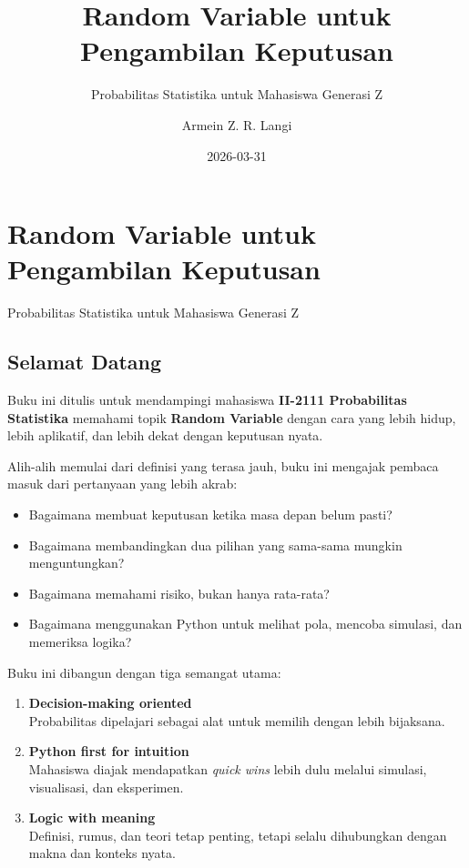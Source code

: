 \documentclass[
  letterpaper,
  DIV=11,
  numbers=noendperiod]{scrreprt}
\title{Random Variable untuk Pengambilan Keputusan}
\subtitle{Probabilitas Statistika untuk Mahasiswa Generasi Z}
\author{Armein Z. R. Langi}
\date{2026-03-31}
\providecommand{\tightlist}{%
  \setlength{\itemsep}{0pt}\setlength{\parskip}{0pt}}
\renewcommand*\contentsname{Table of contents}
\newcommand\contentsname{Table of contents}
\begin{document}
\maketitle

\renewcommand*\contentsname{Table of contents}
{
\setcounter{tocdepth}{2}
\tableofcontents
}


\chapter{Random Variable untuk Pengambilan
Keputusan}\label{random-variable-untuk-pengambilan-keputusan}

Probabilitas Statistika untuk Mahasiswa Generasi Z

\hfill\break

\section{Selamat Datang}\label{selamat-datang}

Buku ini ditulis untuk mendampingi mahasiswa \textbf{II-2111
Probabilitas Statistika} memahami topik \textbf{Random Variable} dengan
cara yang lebih hidup, lebih aplikatif, dan lebih dekat dengan keputusan
nyata.

Alih-alih memulai dari definisi yang terasa jauh, buku ini mengajak
pembaca masuk dari pertanyaan yang lebih akrab:

\begin{itemize}
\tightlist
\item
  Bagaimana membuat keputusan ketika masa depan belum pasti?
\item
  Bagaimana membandingkan dua pilihan yang sama-sama mungkin
  menguntungkan?
\item
  Bagaimana memahami risiko, bukan hanya rata-rata?
\item
  Bagaimana menggunakan Python untuk melihat pola, mencoba simulasi, dan
  memeriksa logika?
\end{itemize}

Buku ini dibangun dengan tiga semangat utama:

\begin{enumerate}
\def\labelenumi{\arabic{enumi}.}
\item
  \textbf{Decision-making oriented}\\
  Probabilitas dipelajari sebagai alat untuk memilih dengan lebih
  bijaksana.
\item
  \textbf{Python first for intuition}\\
  Mahasiswa diajak mendapatkan \emph{quick wins} lebih dulu melalui
  simulasi, visualisasi, dan eksperimen.
\item
  \textbf{Logic with meaning}\\
  Definisi, rumus, dan teori tetap penting, tetapi selalu dihubungkan
  dengan makna dan konteks nyata.
\end{enumerate}
\end{document}
